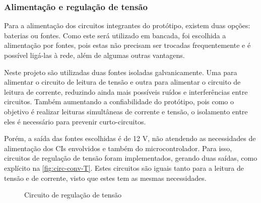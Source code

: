 \subsubsection{Alimentação e regulação de tensão}

Para a alimentação dos circuitos integrantes do protótipo, existem duas opções: baterias ou fontes. Como este será utilizado em bancada, foi escolhida a alimentação por fontes, pois estas não precisam ser trocadas frequentemente e é possível ligá-las à rede, além de algumas outras vantagens.

Neste projeto são utilizadas duas fontes isoladas galvanicamente. Uma para alimentar o circuito de leitura de tensão e outra para alimentar o circuito de leitura de corrente, reduzindo ainda mais possíveis ruídos e interferências entre circuitos. Também aumentando a confiabilidade do protótipo, pois como o objetivo é realizar leituras simultâneas de corrente e tensão, o isolamento entre eles é necessário para prevenir curto-circuitos.

Porém, a saída das fontes escolhidas é de 12 V, não atendendo as necessidades de alimentação dos \gls{CI}s envolvidos e também do microcontrolador. Para isso, circuitos de regulação de tensão foram implementados, gerando duas saídas, como explícito na \autoref{fig:circ-conv-T}. Estes circuitos são iguais tanto para a leitura de tensão e de corrente, visto que estes tem as mesmas necessidades.

\begin{figure}[htb!]
    \caption{Circuito de regulação de tensão}
    \vspace*{5mm}
    \label{fig:circ-conv-T}
    \fonte{}
\end{figure}

